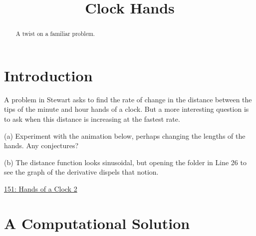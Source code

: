 \documentclass{ximera}
\title{Clock Hands}
\begin{document}
\begin{abstract}
A twist on a familiar problem.
\end{abstract}
\maketitle

\section*{Introduction}
A problem in Stewart asks to find the rate of change in the distance between the tips of the minute and hour hands of a clock. But a more interesting question is to ask when this distance is increasing at the fastest rate. 


\begin{exploration}
(a) Experiment with the animation below, perhaps changing the lengths of the hands. Any conjectures?

(b) The distance function looks sinusoidal, but opening the folder in Line 26 to see the graph of the derivative dispels that notion. 

\begin{onlineOnly}
    \begin{center}
\end{center}
\end{onlineOnly}

\href{https://www.desmos.com/calculator/pnpf5uhbre}{151: Hands of a Clock 2}


\end{exploration}

\section*{A Computational Solution}
\end{document}
